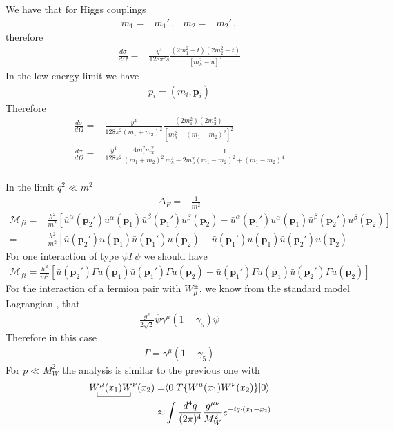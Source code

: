 We have that for Higgs couplings
\begin{align}
  m_1=&m_1'\,,&m_2=&m_2'\,,
\end{align}
therefore
\begin{align}
    \frac{d\sigma}{d\Omega}
=&\frac{y^4}{128\pi^2s}
  \frac{ \left(2m_1^2-t  \right)\left( 2m_2^2-t \right)}{\left[m^2_h -u\right]^2}
\end{align}
In the low energy limit we have
\begin{align}
  p_i=\left(m_i,\mathbf{p}_i  \right)
\end{align}
Therefore
\begin{align}
  \frac{d\sigma}{d\Omega}=&\frac{y^4}{128 \pi^2 \left(m_1+m_2 \right)^2}\frac{\left( 2m_1^2 \right)\left( 2m_2^2 \right)}{
\left[ m_h^2-\left(m_1-m_2  \right)^2 \right]^2} \nonumber\\
  \frac{d\sigma}{d\Omega}=&\frac{y^4}{128 \pi^2 }\frac{4m_1^2m_2^2}{\left(m_1+m_2 \right)^2}\frac{1}{
 m_h^4-2m_h^{2}\left(m_1-m_2  \right)^2+\left(m_1-m_2  \right)^4 } \nonumber\\
\end{align}



In the limit $q^2\ll m^2$
\begin{align}
  \Delta_F=-\frac{1}{m^2}
\end{align}
\begin{align}
  \mathcal{M}_{fi}=&\frac{h^2}{m^2}\left[
\bar{u}^\alpha(\mathbf{p}_2')u^\alpha(\mathbf{p}_1)\bar{u}^\beta(\mathbf{p}_1')u^\beta(\mathbf{p}_2)
-\bar{u}^\alpha(\mathbf{p}_1')u^\alpha(\mathbf{p}_1)\bar{u}^\beta(\mathbf{p}_2')u^\beta(\mathbf{p}_2)
\right]\nonumber\\
=&\frac{h^2}{m^2}\left[
\bar{u}(\mathbf{p}_2')u(\mathbf{p}_1)\bar{u}(\mathbf{p}_1')u(\mathbf{p}_2)
-\bar{u}(\mathbf{p}_1')u(\mathbf{p}_1)\bar{u}(\mathbf{p}_2')u(\mathbf{p}_2)
\right]
\end{align}
For one interaction of type $\overline{\psi}\Gamma\psi$ we should have
\begin{align}
  \mathcal{M}_{fi}=\frac{h^2}{m^2}\left[
\bar{u}(\mathbf{p}_2')\Gamma u(\mathbf{p}_1)\bar{u}(\mathbf{p}_1')\Gamma u(\mathbf{p}_2)
-\bar{u}(\mathbf{p}_1')\Gamma u(\mathbf{p}_1)\bar{u}(\mathbf{p}_2')\Gamma u(\mathbf{p}_2)
\right]
\end{align}
For the interaction of a fermion pair with $W_\mu^\pm$, we know from
the standard model Lagrangian \cite{lsm}, that
\begin{align}
  \frac{g^2}{2\sqrt{2}}\overline{\psi}\gamma^\mu(1-\gamma_5)\psi
\end{align}
Therefore in this case
\begin{align}
  \Gamma=\gamma^\mu(1-\gamma_5)
\end{align}
For $p\ll M_W^2$ the analysis is similar to the previous one with
\begin{align}
   \bcontraction{\,}{W^\mu}{(x_1)}{W^\nu}
\,W^\mu(x_1)W^\nu(x_2)=&\langle0|T\{W^\mu(x_1)W^\nu(x_2)\}|0\rangle\nonumber\\
\approx&\int\frac{d^4q}{(2\pi)^4}\frac{g^{\mu\nu}}{M_W^2}e^{-i q\cdot(x_1-x_2)}
\end{align}

